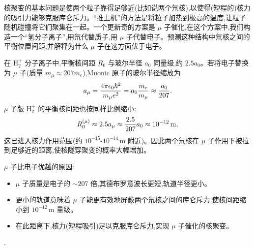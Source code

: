 \begin{question}
核聚变的基本问题是使两个粒子靠得足够近(比如说两个氘核),以使得(短程的)核力的吸引力能够克服库仑斥力。“推土机”的方法是将粒子加热到极高的温度,让粒子随机碰撞将它们聚集在一起。一个更新奇的方案是 $\mu$ 子催化,在这个方案中,我们构造一个“氢分子离子”,用氘代替质子,用 $\mu$ 子代替电子。预测这种结构中氘核之间的平衡位置间距,并解释为什么 $\mu$ 子在这方面优于电子。
\end{question}
\begin{solution}
在 $\mathrm H_2^+$ 分子离子中,平衡核间距 $R_0$ 与玻尔半径 $a_0$ 同量级,约 $2.5a_0$。若将电子替换为 $\mu$ 子(质量 $m_\mu\approx207m_e$),Muonic 原子的玻尔半径缩放为
\[
a_\mu={4\pi\epsilon_0\hbar^2\over m_\mu e^2}=a_0{m_e\over m_\mu}\approx{a_0\over207}.
\]
$\mu$ 子版 $\mathrm H_2^+$ 的平衡核间距也按同样比例缩小:
\[
R_0^{(\mu)}\approx2.5a_\mu\approx{2.5\over207}a_0\approx10^{-12}\,\mathrm{m},
\]
这已进入核力作用范围(约 $10^{-15}\text{-}10^{-14}\,\mathrm{m}$ 附近)。因此两个氘核在 $\mu$ 子作用下被拉到足够近的距离,使核隧穿聚变的概率大幅增加。

$\mu$ 子比电子优越的原因:
\begin{itemize}
\item $\mu$ 子质量是电子的 $\sim207$ 倍,其德布罗意波长更短,轨道半径更小。
\item 更小的轨道意味着 $\mu$ 子能更有效地屏蔽两个氘核之间的库仑斥力,使核间距缩小到 $10^{-12}\,\mathrm{m}$ 量级。
\item 在此距离下,核力(短程吸引)足以克服库仑斥力,实现 $\mu$ 子催化的核聚变。
\end{itemize}
.
\end{solution}

